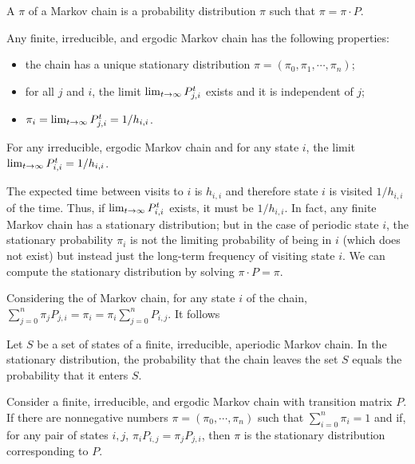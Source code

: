 \documentclass[main.tex]{subfiles}
\begin{document}
A  $\pi$ of a Markov chain is a probability distribution $\pi$ such that $\pi=\pi\cdot P$.

\begin{theorem}
	Any finite, irreducible, and ergodic Markov chain has the following properties:
	\begin{itemize}
		\item the chain has a unique stationary distribution $\pi=(\pi_0,\pi_1,\cdots,\pi_n)$;
		\item for all $j$ and $i$, the limit $\lim_{t\rightarrow\infty}P^t_{j,i}$ exists and it is independent of $j$;
		\item $\pi_i=\lim_{t\rightarrow\infty}P^t_{j,i}=1/h_{i,i}$.
	\end{itemize}
\end{theorem}

\begin{lemma}
	For any irreducible, ergodic Markov chain and for any state $i$, the limit $\lim_{t\rightarrow\infty}P^t_{i,i}=1/h_{i,i}$.
\end{lemma}

The expected time between visits to $i$ is $h_{i,i}$ and therefore state $i$ is visited $1/h_{i,i}$ of the time. Thus, if $\lim_{t\rightarrow\infty}P^t_{i,i}$ exists, it must be $1/h_{i,i}$. In fact, any finite Markov chain has a stationary distribution; but in the case of periodic state $i$, the stationary probability $\pi_i$ is not the limiting probability of being in $i$ (which does not exist) but instead just the long-term frequency of visiting state $i$. We can compute the stationary distribution by solving $\pi\cdot P = \pi$.

Considering the  of Markov chain, for any state $i$ of the chain, $\sum_{j=0}^{n}\pi_jP_{j,i}=\pi_i=\pi_i\sum_{j=0}^{n}P_{i,j}$. It follows

\begin{theorem}
	Let $S$ be a set of states of a finite, irreducible, aperiodic Markov chain. In the stationary distribution, the probability that the chain leaves the set $S$ equals the probability that it enters $S$.
\end{theorem}

\begin{theorem}
	Consider a finite, irreducible, and ergodic Markov chain with transition matrix $P$. If there are nonnegative numbers $\pi=(\pi_0,\cdots,\pi_n)$ such that $\sum_{i=0}^{n}\pi_i=1$ and if, for any pair of states $i,j$, $\pi_iP_{i,j}=\pi_jP_{j,i}$, then $\pi$ is the stationary distribution corresponding to $P$.
\end{theorem}
\end{document}
